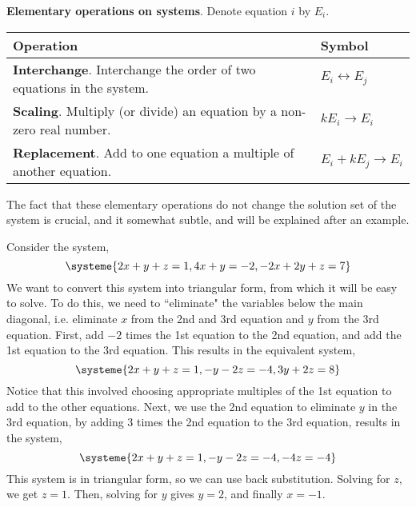 \documentclass[letterpaper,12pt]{article}
\begin{document}
\begin{definition}
\textbf{Elementary operations on systems}. Denote equation $i$ by $E_i$.
\begin{table}[H]
    \centering
    \begin{tabular}{l|l}
        Operation & Symbol \\ \hline
        \textbf{Interchange}. Interchange the order of two equations in the system. & $E_i \leftrightarrow E_j$ \\
        \textbf{Scaling}. Multiply (or divide) an equation by a non-zero real number. & $kE_i \rightarrow E_i$ \\
        \textbf{Replacement}. Add to one equation a multiple of another equation. & $E_i + kE_j \rightarrow E_i$
    \end{tabular}
\end{table}
\end{definition}

The fact that these elementary operations do not change the solution set of the system is crucial, and it somewhat subtle, and will be explained after an example.

\begin{example}
Consider the system,
\begin{equation*}
    \systeme{2x + y + z = 1, 4x + y = -2, -2x + 2y + z = 7}
\end{equation*}
We want to convert this system into triangular form, from which it will be easy to solve. To do this, we need to ``eliminate" the variables below the main diagonal, i.e. eliminate $x$ from the 2nd and 3rd equation and $y$ from the 3rd equation. First, add $-2$ times the 1st equation to the 2nd equation, and add the 1st equation to the 3rd equation. This results in the equivalent system,
\begin{equation*}
    \systeme{2x + y + z = 1, -y - 2z = -4, 3y + 2z = 8}
\end{equation*}
Notice that this involved choosing appropriate multiples of the 1st equation to add to the other equations. Next, we use the 2nd equation to eliminate $y$ in the 3rd equation, by adding 3 times the 2nd equation to the 3rd equation, results in the system,
\begin{equation*}
    \systeme{2x + y + z = 1, -y - 2z = -4, -4z = -4}
\end{equation*}
This system is in triangular form, so we can use back substitution. Solving for $z$, we get $z = 1$. Then, solving for $y$ gives $y = 2$, and finally $x = -1$.
\end{example}
\end{document}
